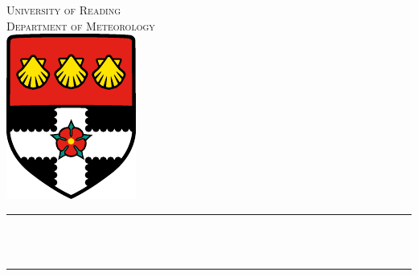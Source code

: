 \begin{titlingpage}
\makeatletter
\begin{center}
\textsc{\Large University of Reading} \\[8pt]
\textsc{{\Large Department of Meteorology}} \\[16pt]
\includegraphics{uor-logo} \\[48pt]

\rule{\textwidth}{.4pt} \\[12pt]
{ \huge \bfseries \@title \\[16pt] } \rule{\textwidth}{.4pt} \\[54pt]
{\LARGE \@author}
\vfill
{\Large \@date}
\end{center}
\makeatother
\end{titlingpage}
